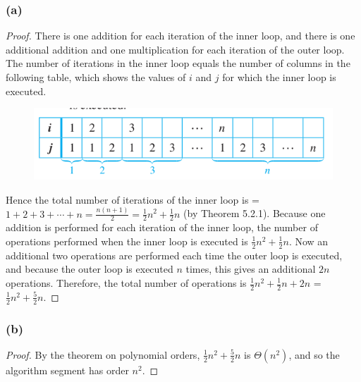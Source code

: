 \documentclass[14pt]{extarticle}
\begin{document}
\subsubsection{(a)}
\begin{proof}
There is one addition for each iteration of the inner loop, and there is one additional addition and one multiplication 
for each iteration of the outer loop. The number of iterations in the inner loop equals the number of columns in the 
following table, which shows the values of \(i\) and \(j\) for which the inner loop is executed.

\begin{figure}[ht!]
\centering
\includegraphics[scale=0.5]{../images/11.3.14.a.png}
\end{figure}

Hence the total number of iterations of the inner loop is = \(1 + 2 + 3 + \cdots + n = \frac{n(n+1)}{2} = \frac{1}{2}n^2 +
\frac{1}{2}n\) (by Theorem 5.2.1). Because one addition is performed for each iteration of the inner loop, the number of 
operations performed when the inner loop is executed is \(\frac{1}{2}n^2 + \frac{1}{2}n\). Now an additional two 
operations are performed each time the outer loop is executed, and because the outer loop is executed \(n\) times, this gives 
an additional \(2n\) operations. Therefore, the total number of operations is \(\frac{1}{2}n^2 + \frac{1}{2}n + 2n\)
= \(\frac{1}{2}n^2 + \frac{5}{2}n\).
\end{proof}

\subsubsection{(b)}
\begin{proof}
By the theorem on polynomial orders, \(\frac{1}{2}n^2 + \frac{5}{2}n\) is \(\Theta(n^2)\), and so the algorithm 
segment has order \(n^2\).
\end{proof}
\end{document}
